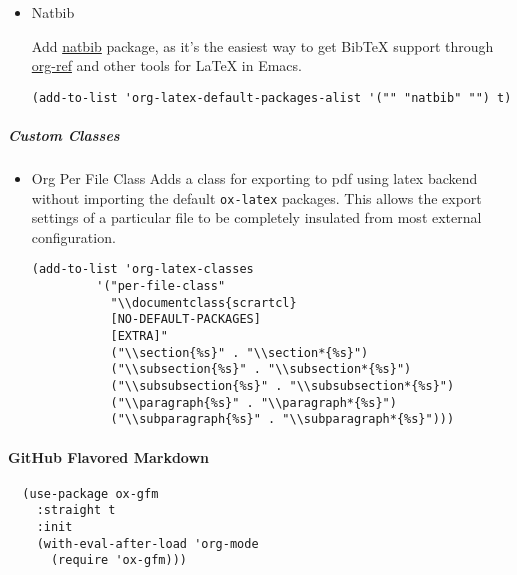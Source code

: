 \documentclass[11pt]{article}
\begin{document}
\begin{itemize}
\item Natbib
\label{sec:orgaafcae6}

Add \href{https://ctan.org/pkg/natbib?lang=en}{natbib} package, as it's the easiest way to get BibTeX support
through \href{https://github.com/jkitchin/org-ref/blob/master/org-ref.org}{org-ref} and other tools for \LaTeX{} in Emacs.

\begin{verbatim}
(add-to-list 'org-latex-default-packages-alist '("" "natbib" "") t)
\end{verbatim}
\end{itemize}

\subparagraph*{Custom Classes}
\label{sec:org5eb231c}
\begin{itemize}
\item Org Per File Class
\label{sec:orgc010ab3}
Adds a class for exporting to pdf using latex backend without
importing the default \texttt{ox-latex} packages. This allows the export
settings of a particular file to be completely insulated from most external
configuration.

\begin{verbatim}
(add-to-list 'org-latex-classes
	     '("per-file-class"
	       "\\documentclass{scrartcl}
	       [NO-DEFAULT-PACKAGES]
	       [EXTRA]"
	       ("\\section{%s}" . "\\section*{%s}")
	       ("\\subsection{%s}" . "\\subsection*{%s}")
	       ("\\subsubsection{%s}" . "\\subsubsection*{%s}")
	       ("\\paragraph{%s}" . "\\paragraph*{%s}")
	       ("\\subparagraph{%s}" . "\\subparagraph*{%s}")))
\end{verbatim}
\end{itemize}

\paragraph*{GitHub Flavored Markdown}
\label{sec:orgaa51f6a}

\begin{verbatim}
  (use-package ox-gfm
    :straight t
    :init
    (with-eval-after-load 'org-mode
      (require 'ox-gfm)))
\end{verbatim}
\end{document}
